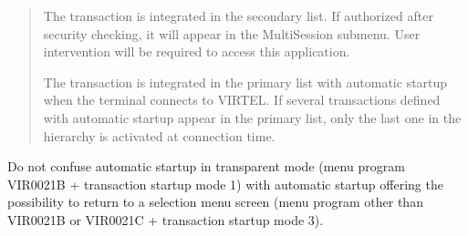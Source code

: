 \documentclass[letterpaper,10pt,english]{sphinxmanual}
\begin{document}
\begin{description}
\begin{quote}
\begin{description}
\sphinxAtStartPar
The transaction is integrated in the secondary list. If authorized after security checking, it will appear in the Multi\sphinxhyphen{}Session sub\sphinxhyphen{}menu. User intervention will be required to access this application.

\sphinxAtStartPar
The transaction is integrated in the primary list with automatic startup when the terminal connects to VIRTEL. If several transactions defined with automatic startup appear in the primary list, only the last one in the hierarchy is activated at connection time.

\end{description}
\end{quote}

\sphinxAtStartPar
Do not confuse automatic startup in transparent mode (menu program VIR0021B + transaction startup mode 1) with automatic startup offering the possibility to return to a selection menu screen (menu program other than VIR0021B or VIR0021C + transaction startup mode 3).

\end{description}
\end{document}
